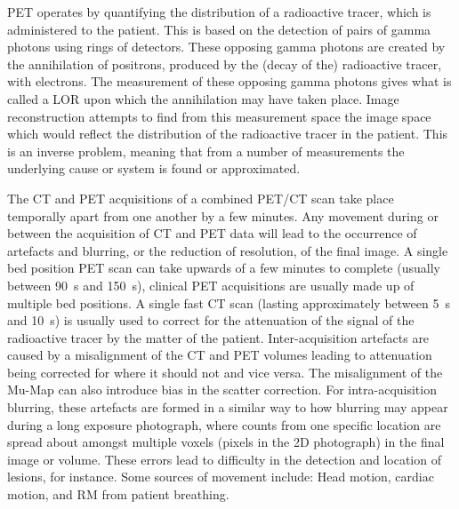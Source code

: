         \gls{PET} operates by quantifying the distribution of a radioactive tracer, which is administered to the patient. This is based on the detection of pairs of gamma photons using rings of detectors. These opposing gamma photons are created by the annihilation of positrons, produced by the (decay of the) radioactive tracer, with electrons. The measurement of these opposing gamma photons gives what is called a \gls{LOR} upon which the annihilation may have taken place. Image reconstruction attempts to find from this measurement space the image space which would reflect the distribution of the radioactive tracer in the patient. This is an inverse problem, meaning that from a number of measurements the underlying cause or system is found or approximated.
            
        The \gls{CT} and \gls{PET} acquisitions of a combined \gls{PET}/\gls{CT} scan take place temporally apart from one another by a few minutes. Any movement during or between the acquisition of \gls{CT} and \gls{PET} data will lead to the occurrence of artefacts and blurring, or the reduction of resolution, of the final image. A single bed position \gls{PET} scan can take upwards of a few minutes to complete (usually between \SI{90}{\second} and \SI{150}{\second}), clinical \gls{PET} acquisitions are usually made up of multiple bed positions. A single fast \gls{CT} scan (lasting approximately between \SI{5}{\second} and \SI{10}{\second}) is usually used to correct for the attenuation of the signal of the radioactive tracer by the matter of the patient. Inter-acquisition artefacts are caused by a misalignment of the \gls{CT} and \gls{PET} volumes leading to attenuation being corrected for where it should not and vice versa. The misalignment of the \gls{Mu-Map} can also introduce bias in the scatter correction. For intra-acquisition blurring, these artefacts are formed in a similar way to how blurring may appear during a long exposure photograph, where counts from one specific location are spread about amongst multiple voxels (pixels in the \gls{2D} photograph) in the final image or volume. These errors lead to difficulty in the detection and location of lesions, for instance. Some sources of movement include: Head motion, cardiac motion, and \gls{RM} from patient breathing.
    
